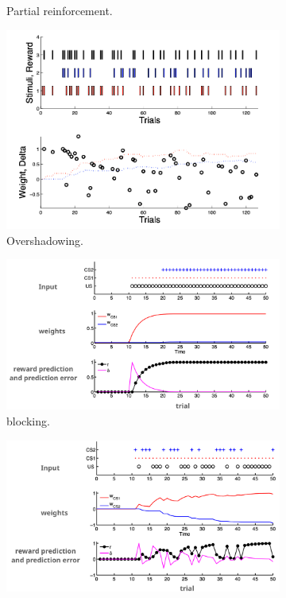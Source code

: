 \documentclass[11pt]{book} %
\begin{document}
\begin{figure}[ht]
\begin{subfigure}[b]{0.31\textwidth}
        \caption{Partial reinforcement.}
        \label{fig:blocking}
    \end{subfigure}
    \begin{subfigure}[b]{0.5\textwidth}
        \centering
        \includegraphics[width=\textwidth]{./Figs/overshadow_exp.png}
        \caption{Overshadowing.}
        \label{fig:rescorla_wagner}
    \end{subfigure}
    \begin{subfigure}[b]{0.5\textwidth}
        \centering
        \includegraphics[width=\textwidth]{./Figs/blocking_exp.jpeg}
        \caption{blocking.}
        \label{fig:overshadowing}
    \end{subfigure}
    \begin{subfigure}[b]{0.5\textwidth}
        \centering
        \includegraphics[width=\textwidth]{./Figs/inhibitory_exp.jpeg}

\end{subfigure}
\end{figure}
\end{document}
